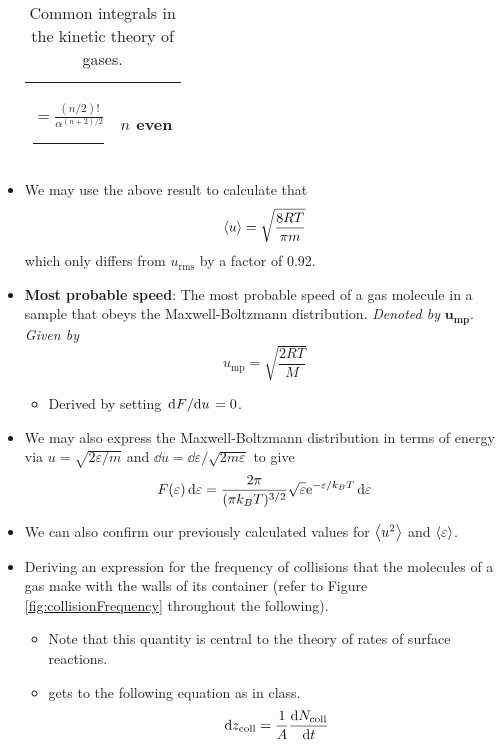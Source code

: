 \documentclass[../notes.tex]{subfiles}
\begin{document}
\begin{itemize}
\begin{table}[H]
\begin{tabular}{cc}
            $\displaystyle=\frac{(n/2)!}{\alpha^{(n+2)/2}}$\rule{1mm}{0pt} & $n$ even\\
            \bottomrule
        \end{tabular}
        \caption{Common integrals in the kinetic theory of gases.}
        \label{tab:commonIntegrals}
    \end{table}
    \item We may use the above result to calculate that
    \begin{equation*}
        \prb{u} = \sqrt{\frac{8RT}{\pi m}}
    \end{equation*}
    which only differs from $u_\text{rms}$ by a factor of 0.92.
    \item \textbf{Most probable speed}: The most probable speed of a gas molecule in a sample that obeys the Maxwell-Boltzmann distribution. \emph{Denoted by} $\bm{u_\text{mp}}$. \emph{Given by}
    \begin{equation*}
        u_\text{mp} = \sqrt{\frac{2RT}{M}}
    \end{equation*}
    \begin{itemize}
        \item Derived by setting $\dv*{F}{u}=0$.
    \end{itemize}
    \item We may also express the Maxwell-Boltzmann distribution in terms of energy via $u=\sqrt{2\varepsilon/m}$ and $\dd{u}=\dd{\varepsilon}/\sqrt{2m\varepsilon}$ to give
    \begin{equation*}
        F(\varepsilon)\dd{\varepsilon} = \frac{2\pi}{(\pi k_BT)^{3/2}}\sqrt{\varepsilon}\e[-\varepsilon/k_BT]\dd{\varepsilon}
    \end{equation*}
    \item We can also confirm our previously calculated values for $\prb{u^2}$ and $\prb{\varepsilon}$.
    \item {}Deriving an expression for the frequency of collisions that the molecules of a gas make with the walls of its container (refer to Figure \ref{fig:collisionFrequency} throughout the following).
    \begin{itemize}
        \item Note that this quantity is central to the theory of rates of surface reactions.
        \item \textcite{bib:McQuarrieSimon} gets to the following equation as in class.
        \begin{equation*}
            \dd{z_\text{coll}} = \frac{1}{A}\dv{N_\text{coll}}{t}

\end{equation*}
\end{itemize}
\end{itemize}
\end{document}
